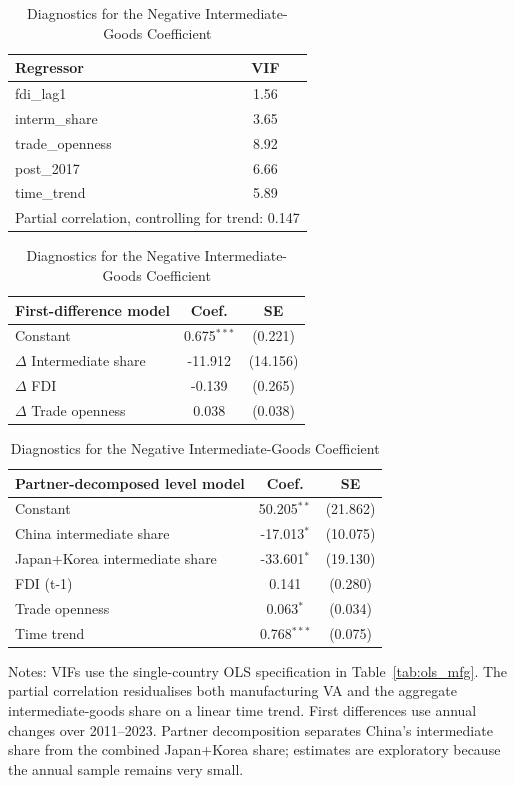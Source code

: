 
\begin{table}[!htbp]\centering
\caption{Diagnostics for the Negative Intermediate-Goods Coefficient}
\label{tab:intermediate_diagnostics}
\small
\begin{tabular}{lc}
\hline\hline
Regressor & VIF \\
\hline
fdi\_lag1 & 1.56 \\
interm\_share & 3.65 \\
trade\_openness & 8.92 \\
post\_2017 & 6.66 \\
time\_trend & 5.89 \\
\hline
\multicolumn{2}{l}{Partial correlation, controlling for trend: 0.147} \\
\hline\hline
\end{tabular}
\quad
\begin{tabular}{lcc}
\hline\hline
First-difference model & Coef. & SE \\
\hline
Constant & 0.675$^{***}$ & (0.221) \\
$\Delta$ Intermediate share & -11.912 & (14.156) \\
$\Delta$ FDI & -0.139 & (0.265) \\
$\Delta$ Trade openness & 0.038 & (0.038) \\
\hline\hline
\end{tabular}

\vspace{0.75em}
\begin{tabular}{lcc}
\hline\hline
Partner-decomposed level model & Coef. & SE \\
\hline
Constant & 50.205$^{**}$ & (21.862) \\
China intermediate share & -17.013$^{*}$ & (10.075) \\
Japan+Korea intermediate share & -33.601$^{*}$ & (19.130) \\
FDI (t-1) & 0.141 & (0.280) \\
Trade openness & 0.063$^{*}$ & (0.034) \\
Time trend & 0.768$^{***}$ & (0.075) \\
\hline\hline
\end{tabular}
\begin{minipage}{0.92\textwidth}
\footnotesize Notes: VIFs use the single-country OLS specification in Table~\ref{tab:ols_mfg}. The partial correlation residualises both manufacturing VA and the aggregate intermediate-goods share on a linear time trend. First differences use annual changes over 2011--2023. Partner decomposition separates China's intermediate share from the combined Japan+Korea share; estimates are exploratory because the annual sample remains very small.
\end{minipage}
\end{table}
